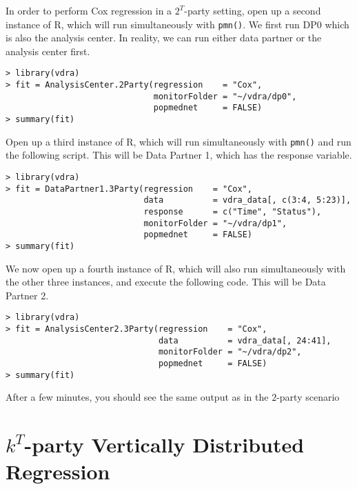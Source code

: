\documentclass[12]{article}
\begin{document}
In order to perform Cox regression in a $2^T$-party setting, open up a second instance of R, which will run simultaneously with \verb"pmn()".  We first run DP0 which is also the analysis center.  In reality, we can run either data partner or the analysis center first.

\begin{verbatim}
> library(vdra)
> fit = AnalysisCenter.2Party(regression    = "Cox",
                              monitorFolder = "~/vdra/dp0",
                              popmednet     = FALSE)
> summary(fit)
\end{verbatim}

Open up a third instance of R, which will run simultaneously with \verb"pmn()" and run the following script.  This will be Data Partner 1, which has the response variable.

\begin{verbatim}
> library(vdra)
> fit = DataPartner1.3Party(regression    = "Cox",
                            data          = vdra_data[, c(3:4, 5:23)],
                            response      = c("Time", "Status"),
                            monitorFolder = "~/vdra/dp1",
                            popmednet     = FALSE)
> summary(fit)
\end{verbatim}

We now open up a fourth instance of R, which will also run simultaneously with the other three instances, and execute the following code.  This will be Data Partner 2.

\begin{verbatim}
> library(vdra)
> fit = AnalysisCenter2.3Party(regression    = "Cox",
                               data          = vdra_data[, 24:41],
                               monitorFolder = "~/vdra/dp2",
                               popmednet     = FALSE)
> summary(fit)
\end{verbatim}

After a few minutes, you should see the same output as in the $2$-party scenario


\section{$k^T$-party Vertically Distributed Regression}
\end{document}
